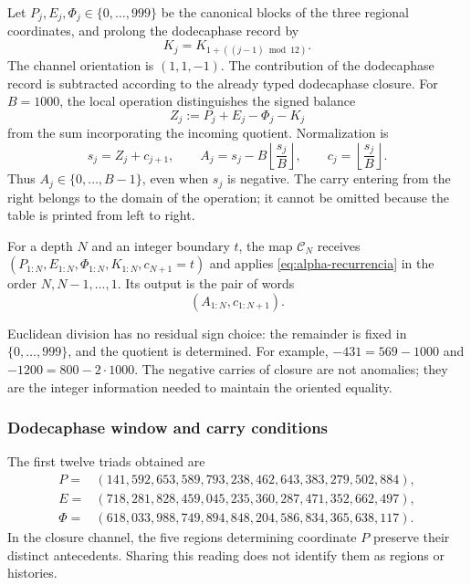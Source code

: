 Let \(P_j,E_j,\Phi_j\in\{0,\ldots,999\}\) be the canonical blocks of
the three regional coordinates, and prolong the dodecaphase record by
\[
 K_j=K_{1+((j-1)\bmod12)}.
\]
The channel orientation is \((1,1,-1)\). The contribution of the dodecaphase record is
subtracted according to the already typed dodecaphase closure. For \(B=1000\), the
local operation distinguishes the signed balance
\[
 Z_j:=P_j+E_j-\Phi_j-K_j
\]
from the sum incorporating the incoming quotient. Normalization is
\begin{equation}
 s_j=Z_j+c_{j+1},\qquad
 A_j=s_j-B\left\lfloor\frac{s_j}{B}\right\rfloor,
 \qquad c_j=\left\lfloor\frac{s_j}{B}\right\rfloor.
 \label{eq:alpha-recurrencia}
\end{equation}
Thus \(A_j\in\{0,\ldots,B-1\}\), even when \(s_j\) is
negative. The carry entering from the right belongs to the domain of
the operation; it cannot be omitted because the table is printed from left
to right.

\begin{definition}
\label{def:alpha-finita}
For a depth \(N\) and an integer boundary \(t\), the map
\(\mathcal C_N\) receives
\((P_{1:N},E_{1:N},\Phi_{1:N},K_{1:N},c_{N+1}=t)\) and applies
\eqref{eq:alpha-recurrencia} in the order \(N,N-1,\ldots,1\). Its output
is the pair of words
\[
 (A_{1:N},c_{1:N+1}).
\]
\end{definition}

Euclidean division has no residual sign choice: the remainder is
fixed in \(\{0,\ldots,999\}\), and the quotient is determined. For
example, \(-431=569-1000\) and \(-1200=800-2\cdot1000\). The
negative carries of closure are not anomalies; they are the integer
information needed to maintain the oriented equality.

\subsubsection{Dodecaphase window and carry conditions}
\label{subsec:alpha-ventana}

The first twelve triads obtained are
\begin{align*}
 P={}&(141,592,653,589,793,238,462,643,383,279,502,884),\\
 E={}&(718,281,828,459,045,235,360,287,471,352,662,497),\\
 \Phi={}&(618,033,988,749,894,848,204,586,834,365,638,117).
\end{align*}
In the closure channel, the five regions determining coordinate
\(P\) preserve their distinct antecedents. Sharing this reading does not
identify them as regions or histories.

